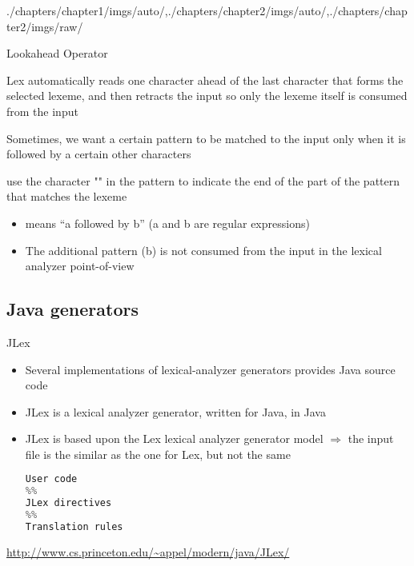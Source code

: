 \begin{graphicspathcontext}{{./chapters/chapter1/imgs/auto/},{./chapters/chapter2/imgs/auto/},{./chapters/chapter2/imgs/raw/}}
\begin{bibunit}[apalike]
\begin{frame}[background=8]{Lookahead Operator}
	\begin{description}
	\item Lex automatically reads one character ahead of the last character that forms the selected lexeme, and then retracts the input so only the lexeme itself is consumed from the input
	\vfill
	\item[Problem] Sometimes, we want a certain pattern to be matched to the input only when it is followed by a certain other characters
	\vfill
	\item[Solution] use the character "\code{/}" in the pattern to indicate the end of the part of the pattern that matches the lexeme
		\begin{itemize}
		\item {} means ``a followed by b'' (a and b are regular expressions) 
		\item The additional pattern (b) is not consumed from the input in the lexical analyzer point-of-view
		\end{itemize}
	\end{description}
\end{frame}

\subsection{Java generators}
\subsectiontableofcontentslide

\begin{frame}[fragile,background=6]{JLex}
	\begin{itemize}
	\item Several implementations of lexical-analyzer generators provides Java source code
	\vfill
	\item JLex is a lexical analyzer generator, written for Java, in Java
	\item JLex is based upon the Lex lexical analyzer generator model $\Rightarrow$ \alert{the input file is the similar as the one for Lex, but not the same}
		\begin{lstlisting}[language=Python]
User code
%%
JLex directives
%%
Translation rules
		\end{lstlisting}
	\end{itemize}
	\vfill
	\begin{center}
	\url{http://www.cs.princeton.edu/~appel/modern/java/JLex/}
	\end{center}
\end{frame}


\end{bibunit}
\end{graphicspathcontext}
